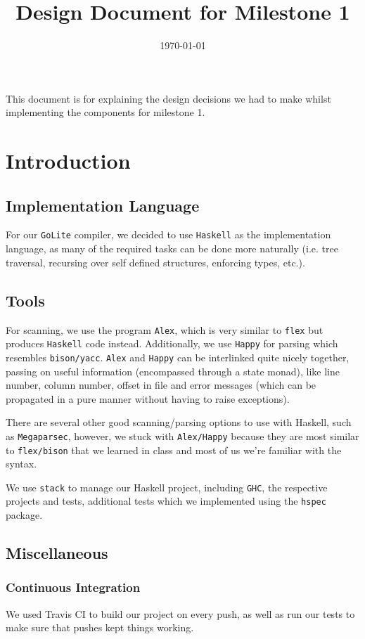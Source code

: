 \documentclass[11pt]{article}
\date{\today}
\title{Design Document for Milestone 1}
\begin{document}
\maketitle
\tableofcontents

This document is for explaining the design decisions we had to make
whilst implementing the components for milestone 1.
\section{Introduction}
\label{sec:orgb562619}
\subsection{Implementation Language}
\label{sec:orge0d3365}
For our \texttt{GoLite} compiler, we decided to use \texttt{Haskell} as the
implementation language, as many of the required tasks can be done
more naturally (i.e. tree traversal, recursing over self defined
structures, enforcing types, etc.).
\subsection{Tools}
\label{sec:orgf33f4c5}
For scanning, we use the program \texttt{Alex}, which is very similar to \texttt{flex}
but produces \texttt{Haskell} code instead. Additionally, we use \texttt{Happy} for
parsing which resembles \texttt{bison/yacc}. \texttt{Alex} and \texttt{Happy} can be interlinked
quite nicely together, passing on useful information (encompassed
through a state monad), like line number, column number, offset in
file and error messages (which can be propagated in a pure manner
without having to raise exceptions).

There are several other good scanning/parsing options to use with
Haskell, such as \texttt{Megaparsec}, however, we stuck with \texttt{Alex/Happy} because
they are most similar to \texttt{flex/bison} that we learned in class and most
of us we're familiar with the syntax.

We use \texttt{stack} to manage our Haskell project, including \texttt{GHC}, the
respective projects and tests, additional tests which we implemented
using the \texttt{hspec} package.
\subsection{Miscellaneous}
\label{sec:org2850819}
\subsubsection{Continuous Integration}
\label{sec:org027af1f}
We used Travis CI to build our project on every push, as well as
run our tests to make sure that pushes kept things working.
\end{document}
